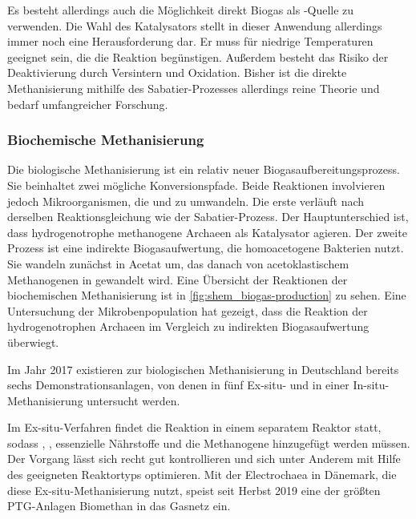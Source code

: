 Es besteht allerdings auch die Möglichkeit direkt Biogas als -Quelle zu verwenden. Die Wahl des Katalysators stellt in dieser Anwendung allerdings immer noch eine Herausforderung dar. Er muss für niedrige Temperaturen geeignet sein, die die Reaktion begünstigen. Außerdem besteht das Risiko der Deaktivierung durch Versintern und Oxidation. Bisher ist die direkte Methanisierung mithilfe des Sabatier-Prozesses allerdings reine Theorie und bedarf umfangreicher Forschung. 
\parencite{AONC2019}


\subsubsection{Biochemische Methanisierung}\label{chap:biochem} 

Die biologische Methanisierung ist ein relativ neuer Biogasaufbereitungsprozess. Sie beinhaltet zwei mögliche Konversionspfade. Beide Reaktionen involvieren jedoch Mikroorganismen, die  und  zu  umwandeln. Die erste verläuft nach derselben Reaktionsgleichung wie der Sabatier-Prozess. Der Hauptunterschied ist, dass hydrogenotrophe methanogene Archaeen als Katalysator agieren. Der zweite Prozess ist eine indirekte Biogasaufwertung, die homoacetogene Bakterien nutzt. Sie wandeln  zunächst in Acetat um, das danach von acetoklastischem Methanogenen in  gewandelt wird. Eine Übersicht der Reaktionen der biochemischen Methanisierung ist in \ref{fig:shem_biogas-production} zu sehen. Eine Untersuchung der Mikrobenpopulation hat gezeigt, dass die Reaktion der hydrogenotrophen Archaeen im Vergleich zu indirekten Biogasaufwertung überwiegt. \parencite{AONC2019} \parencite{KGKK2019} \parencite{VRM2019}



Im Jahr \SI{2017}{\relax} existieren zur biologischen Methanisierung in Deutschland bereits sechs Demonstrationsanlagen, von denen in fünf Ex-situ- und in einer In-situ-Methanisierung untersucht werden. \parencite{4.2b17}\smallskip

Im Ex-situ-Verfahren findet die Reaktion in einem separatem Reaktor statt, sodass , , essenzielle Nährstoffe und die Methanogene hinzugefügt werden müssen. Der Vorgang lässt sich recht gut kontrollieren und sich unter Anderem mit Hilfe des geeigneten Reaktortyps optimieren. Mit der Electrochaea in Dänemark, die diese Ex-situ-Methanisierung nutzt, speist seit Herbst 2019 eine der größten \gls{PTG}-Anlagen Biomethan in das Gasnetz ein. \parencite{AONC2019} \parencite{Echae19} \parencite{KGKK2019} \parencite{VRM2019} \smallskip
 
